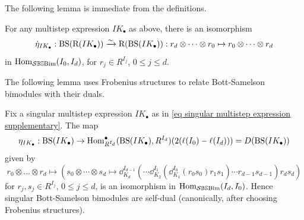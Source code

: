 The following lemma is immediate from the definitions.
\begin{lemma}\label{lemma reversal on bott samelsons and multistep expressions}
    For any  multistep expression $IK_\bullet$ as above, there is an isomorphism 
    $$\dot{\eta}_{IK_\bullet}: \operatorname{BS}(\mathrm{R}(IK_\bullet)) \xrightarrow{\sim} \mathrm{R}(\operatorname{BS}(IK_\bullet)):r_d\otimes \cdots \otimes r_0 \mapsto r_0 \otimes \cdots \otimes r_d$$ in $\operatorname{Hom}_{\mathcal{S}\mathbb{BS}\text{Bim}}(I_0, I_d)$, for $r_j \in R^{I_j}$, $0 \leq j \leq d$.
\end{lemma}

The following lemma uses Frobenius structures to relate Bott-Samelson bimodules with their duals.

\begin{lemma}\label{lemma self duality of Bott-Samelsons}
    Fix a singular multistep expression $IK_\bullet$ as in \cref{eq singular multistep expression supplementary}. 
    The map 
    $$\eta_{IK_\bullet}: \operatorname{BS}(IK_{\bullet}) \to \operatorname{Hom}^\bullet_{R^{I_d}}(\operatorname{BS}(IK_{\bullet}), R^{I_d})(2(\ell(I_0)-\ell(I_d)))=D(\operatorname{BS}(IK_\bullet))$$ 
    given by
    \begin{equation}
        r_0 \otimes \dots \otimes r_d \mapsto \left(s_0\otimes \cdots \otimes s_d \mapsto \dd^{I_{d-1}}_{K_d}\left(\cdots \dd^{I_1}_{K_2}(\dd^{I_0}_{K_1}(r_0s_0)r_1s_1) \cdots r_{d-1}s_{d-1} \right)r_ds_d \right) \label{eq self duality of bott samelsons}
    \end{equation}
   for $r_j, s_j \in R^{I_j}$, $0 \leq j \leq d$, is an isomorphism in $\operatorname{Hom}_{\mathcal{S}\mathbb{BS}\text{Bim}}(I_d,I_0)$.
   Hence singular Bott-Samelson bimodules are self-dual (canonically, after choosing Frobenius structures). 
\end{lemma}
